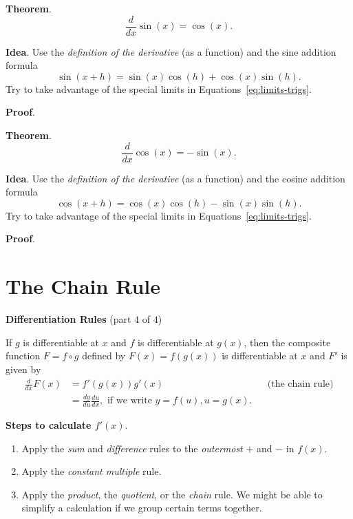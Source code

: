 \documentclass[../main.tex]{subfiles}
\begin{document}
\clearpage
\textbf{Theorem}. 
\[
  \frac{d}{dx} \sin(x) = \cos(x).
\]

\textbf{Idea}. Use the \emph{definition of the derivative} (as a function) and the sine addition formula
\begin{equation} \label{eq:sin-addition}
  \sin(x + h) = \sin(x) \cos(h) + \cos(x) \sin(h).
\end{equation}
Try to take advantage of the special limits in Equations~\eqref{eq:limits-trigs}.

\bigskip
\textbf{Proof}.
\clearpage

\textbf{Theorem}. 
\[
  \frac{d}{dx} \cos(x) = -\sin(x).
\]

\textbf{Idea}. Use the \emph{definition of the derivative} (as a function) and the cosine addition formula
\begin{equation} \label{eq:cos-addition}
  \cos(x + h) = \cos(x) \cos(h) - \sin(x) \sin(h).
\end{equation}
Try to take advantage of the special limits in Equations~\eqref{eq:limits-trigs}.

\bigskip
\textbf{Proof}.  
\clearpage

\section{The Chain Rule}
\begin{mdframed}[style=simple]
  \textbf{Differentiation Rules} \hfill {\footnotesize (part \(4\) of \(4\))}

  If \(g\) is differentiable at \(x\) and \(f\) is differentiable at \(g(x)\), then the composite function \(F = f \circ g\) defined by \(F(x) = f(g(x))\) is differentiable at \(x\) and \(F'\) is given by 
  \begin{align*}
    \frac{d}{dx} F(x) 
    &= f'(g(x)) g'(x)
    &&\text{(the chain rule)}\\[1em]
    &= \frac{dy}{du} \frac{du}{dx}, \text{ if we write } y = f(u), u = g(x).
  \end{align*}
\end{mdframed}

\textbf{Steps to calculate \(f'(x)\)}.
\begin{enumerate}[label=(\arabic*)]
  \item Apply the \emph{sum} and \emph{difference} rules to the \emph{outermost} \(+\) and \(-\) in \(f(x)\). 
  \item Apply the \emph{constant multiple} rule.
  \item Apply the \emph{product}, the \emph{quotient}, or the \emph{chain} rule. We might be able to simplify a calculation if we group certain terms together. 
\end{enumerate}
\bigskip
\end{document}

